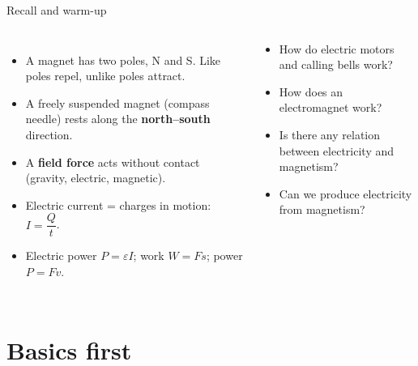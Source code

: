 \documentclass[aspectratio=169,11pt,xcolor=table]{beamer}
\begin{document}
\begin{frame}{Recall and warm-up}
\begin{columns}[c]
\begin{itemize}
\item A magnet has two poles, N and S. Like poles repel, unlike poles attract.
\item A freely suspended magnet (compass needle) rests along the \textbf{north--south} direction.
\item A \textbf{field force} acts without contact (gravity, electric, magnetic).
\item Electric current = charges in motion: $I=\dfrac{Q}{t}$.
\item Electric power $P=\varepsilon I$; work $W=Fs$; power $P=Fv$.
\end{itemize}
\begin{think}
\small
\begin{itemize}
\item How do electric motors and calling bells work?
\item How does an electromagnet work?
\item Is there any relation between electricity and magnetism?
\item Can we produce electricity from magnetism?
\end{itemize}
\end{think}
\end{columns}
\end{frame}


\section{Basics first}
\end{document}
